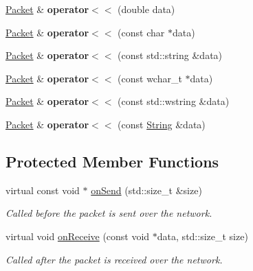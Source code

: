 \begin{DoxyCompactItemize}
\item 
\mbox{\label{classsf_1_1_packet_a3b3077720a486b569ac8e7dec638a3f0}} 
\hyperlink{classsf_1_1_packet}{Packet} \& {\bfseries operator$<$$<$} (double data)
\item 
\mbox{\label{classsf_1_1_packet_a67c9985f7b3d6e90886e56e309280a9d}} 
\hyperlink{classsf_1_1_packet}{Packet} \& {\bfseries operator$<$$<$} (const char $\ast$data)
\item 
\mbox{\label{classsf_1_1_packet_a59a21671caaa69da5d47c54b50e1eb54}} 
\hyperlink{classsf_1_1_packet}{Packet} \& {\bfseries operator$<$$<$} (const std\+::string \&data)
\item 
\mbox{\label{classsf_1_1_packet_a6f7c6a9ce795fac342ea937896d98016}} 
\hyperlink{classsf_1_1_packet}{Packet} \& {\bfseries operator$<$$<$} (const wchar\+\_\+t $\ast$data)
\item 
\mbox{\label{classsf_1_1_packet_a9f3401d038470f629d0c2c6be928a14b}} 
\hyperlink{classsf_1_1_packet}{Packet} \& {\bfseries operator$<$$<$} (const std\+::wstring \&data)
\item 
\mbox{\label{classsf_1_1_packet_abc17272df082a36b202e10045bd9e220}} 
\hyperlink{classsf_1_1_packet}{Packet} \& {\bfseries operator$<$$<$} (const \hyperlink{classsf_1_1_string}{String} \&data)
\end{DoxyCompactItemize}
\subsection*{Protected Member Functions}
\begin{DoxyCompactItemize}
\item 
virtual const void $\ast$ \hyperlink{classsf_1_1_packet_a052e955906c9bfd671622cb625380edc}{on\+Send} (std\+::size\+\_\+t \&size)
\begin{DoxyCompactList}\small\item\em Called before the packet is sent over the network. \end{DoxyCompactList}\item 
virtual void \hyperlink{classsf_1_1_packet_ab71a31ef0f1d5d856de6f9fc75434128}{on\+Receive} (const void $\ast$data, std\+::size\+\_\+t size)
\begin{DoxyCompactList}\small\item\em Called after the packet is received over the network. \end{DoxyCompactList}\end{DoxyCompactItemize}
